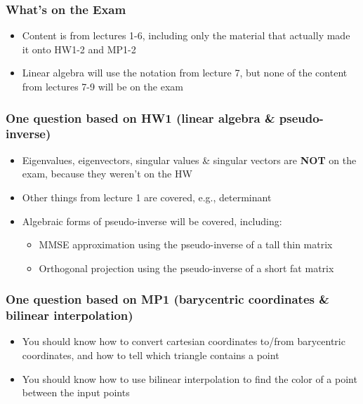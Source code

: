 \documentclass{beamer}
\begin{document}
\begin{frame}
  \frametitle{What's on the Exam}

  \begin{itemize}
  \item Content is from lectures 1-6, including only the material that
    actually made it onto HW1-2 and MP1-2
  \item Linear algebra will use the notation from lecture 7, but
    none of the content from lectures 7-9 will be on the exam
  \end{itemize}
\end{frame}

\begin{frame}
  \frametitle{One question based on HW1 (linear algebra \& pseudo-inverse)}

  \begin{itemize}
  \item Eigenvalues, eigenvectors, singular values \& singular vectors are \textbf{NOT} on the exam,
    because they weren't on the HW
  \item Other things from lecture 1 are covered, e.g., determinant
  \item Algebraic forms of pseudo-inverse will be covered, including:
    \begin{itemize}
    \item MMSE approximation using the pseudo-inverse of a tall thin matrix
    \item Orthogonal projection using the pseudo-inverse of a short fat matrix
    \end{itemize}
  \end{itemize}
\end{frame}

\begin{frame}
  \frametitle{One question based on MP1 (barycentric coordinates \& bilinear interpolation)}

  \begin{itemize}
  \item You should know how to convert cartesian coordinates to/from barycentric coordinates,
    and how to tell which triangle contains a point
  \item You should know how to use bilinear interpolation to find the
    color of a point between the input points
  \end{itemize}
\end{frame}
\end{document}
